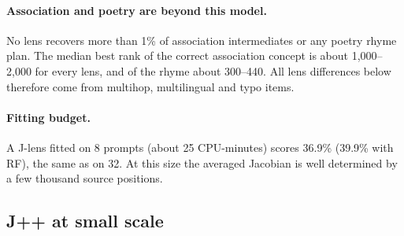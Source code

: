 \documentclass[11pt]{article}
\theoremstyle{definition}
\begin{document}
\paragraph{Association and poetry are beyond this model.} No lens recovers more than 1\% of
association intermediates or any poetry rhyme plan. The median best rank of the correct association
concept is about 1,000--2,000 for every lens, and of the rhyme about 300--440. All lens differences
below therefore come from multihop, multilingual and typo items.

\paragraph{Fitting budget.} A J-lens fitted on 8 prompts (about 25 CPU-minutes) scores 36.9\% (39.9\%
with RF), the same as on 32. At this size the averaged Jacobian is well determined by a few thousand
source positions.

\subsection{J++ at small scale}
\label{sec:jpp}
\end{document}
